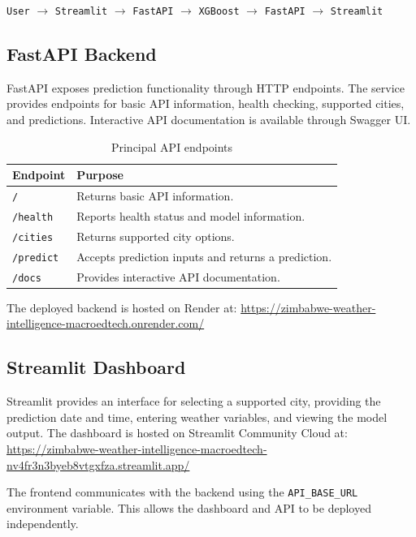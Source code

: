 \documentclass[12pt,a4paper]{article}
\begin{document}
	\begin{center}
		\texttt{User}
		$\rightarrow$ \texttt{Streamlit}
		$\rightarrow$ \texttt{FastAPI}
		$\rightarrow$ \texttt{XGBoost}
		$\rightarrow$ \texttt{FastAPI}
		$\rightarrow$ \texttt{Streamlit}
	\end{center}
	
	\subsection{FastAPI Backend}
	
	FastAPI exposes prediction functionality through HTTP endpoints.
	The service provides endpoints for basic API information, health
	checking, supported cities, and predictions. Interactive API
	documentation is available through Swagger UI.
	
	\begin{table}[H]
		\centering
		\caption{Principal API endpoints}
		\label{tab:api-endpoints}
		\begin{tabular}{lp{9cm}}
			\toprule
			\textbf{Endpoint} & \textbf{Purpose}\\
			\midrule
			\texttt{/} & Returns basic API information.\\
			\texttt{/health} & Reports health status and model information.\\
			\texttt{/cities} & Returns supported city options.\\
			\texttt{/predict} & Accepts prediction inputs and returns a prediction.\\
			\texttt{/docs} & Provides interactive API documentation.\\
			\bottomrule
		\end{tabular}
	\end{table}
	
	The deployed backend is hosted on Render at:
	\url{https://zimbabwe-weather-intelligence-macroedtech.onrender.com/}
	
	\subsection{Streamlit Dashboard}
	
	Streamlit provides an interface for selecting a supported city,
	providing the prediction date and time, entering weather variables,
	and viewing the model output. The dashboard is hosted on Streamlit
	Community Cloud at:
	\url{https://zimbabwe-weather-intelligence-macroedtech-nv4fr3n3byeb8vtgxfza.streamlit.app/}
	
	The frontend communicates with the backend using the
	\texttt{API\_BASE\_URL} environment variable. This allows the
	dashboard and API to be deployed independently.
	
\end{document}
